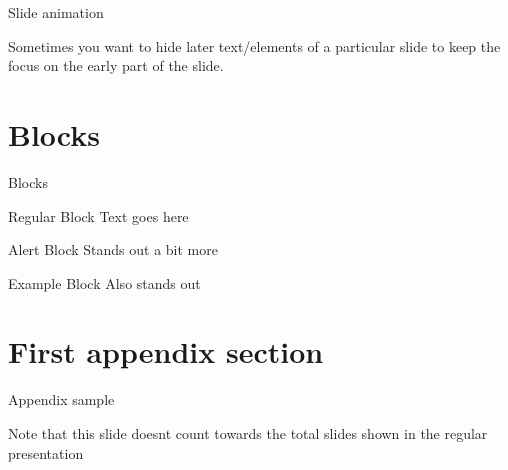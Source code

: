 \documentclass[12pt]{beamer}
\begin{document}
\begin{frame}{Slide animation}

	Sometimes you want to hide later text/elements of a particular slide to keep the focus on the early part of the slide.

	\bigskip


\end{frame}
 
 

\section{Blocks}

\begin{frame}{Blocks}

	\begin{block}{Regular Block}
		Text goes here
	\end{block}

	\begin{alertblock}{Alert Block}
		Stands out a bit more
	\end{alertblock}

	\begin{exampleblock}{Example Block}
		Also stands out
	\end{exampleblock}

\end{frame}


 
\appendix

{\BackgroundShaded
\begin{frame}
\end{frame}
}

  
 
\section{First appendix section}

\begin{frame}{Appendix sample}

	Note that this slide doesnt count towards the total slides shown in the regular presentation

\end{frame}



\end{document}
